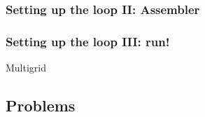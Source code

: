 \begin{frame}
  \frametitle{Setting up the loop II: Assembler}
  \begin{block}{}\footnotesize
    
  \end{block}  
\end{frame}

\begin{frame}
  \frametitle{Setting up the loop III: run!}
  \begin{block}{}\small
    
  \end{block}
  \pause
  \begin{block}{Multigrid}\small
    
  \end{block}
\end{frame}

\subsection{Problems}


